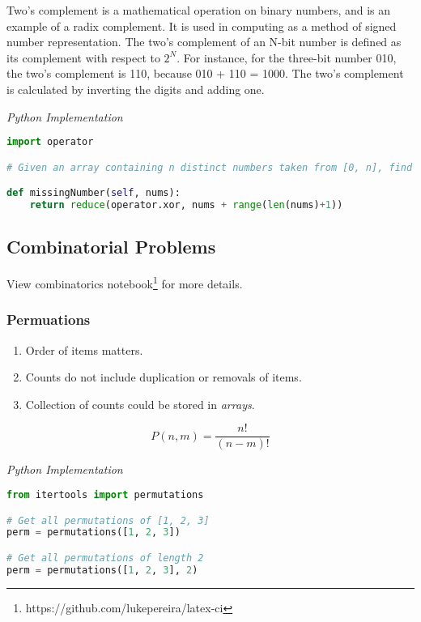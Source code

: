 \documentclass{article}
\begin{document}
    Two's complement is a mathematical operation on binary numbers, and is an example of a radix complement. It is used in computing as a method of signed number representation. The two's complement of an N-bit number is defined as its complement with respect to $2^N$. For instance, for the three-bit number 010, the two's complement is 110, because 010 + 110 = 1000. The two's complement is calculated by inverting the digits and adding one.

\vspace{8pt} \emph{Python Implementation}
\begin{lstlisting}[language=Python]
import operator

# Given an array containing n distinct numbers taken from [0, n], find the one that is missing from the array.

def missingNumber(self, nums):
    return reduce(operator.xor, nums + range(len(nums)+1))
\end{lstlisting}    

\subsection{Combinatorial Problems}

    View combinatorics notebook\footnote{https://github.com/lukepereira/latex-ci} for more details.

    \subsubsection{Permuations}
    \begin{enumerate}
        \item Order of items matters.
        \item Counts do not include duplication or removals of items.
        \item Collection of counts could be stored in \emph{arrays}. 
    \end{enumerate} 
    
    \[
    P(n,m) = \frac{n!}{(n-m)!}
    \]

    
\vspace{8pt} \emph{Python Implementation}
\begin{lstlisting}[language=Python]
from itertools import permutations 

# Get all permutations of [1, 2, 3] 
perm = permutations([1, 2, 3])   

# Get all permutations of length 2 
perm = permutations([1, 2, 3], 2) 
\end{lstlisting} 
\end{document}
